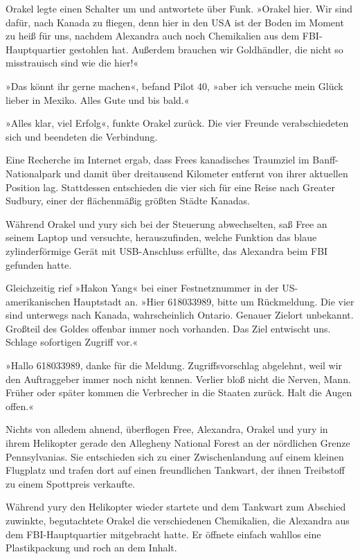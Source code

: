 Orakel legte einen Schalter um und antwortete über Funk. »Orakel hier. Wir sind dafür, nach Kanada zu fliegen, denn hier in den USA ist der Boden im Moment zu heiß für uns, nachdem Alexandra auch noch Chemikalien aus dem FBI-Hauptquartier gestohlen hat. Außerdem brauchen wir Goldhändler, die nicht so misstrauisch sind wie die hier!«

»Das könnt ihr gerne machen«, befand Pilot 40, »aber ich versuche mein Glück lieber in Mexiko. Alles Gute und bis bald.«

»Alles klar, viel Erfolg«, funkte Orakel zurück. Die vier Freunde verabschiedeten sich und beendeten die Verbindung.

Eine Recherche im Internet ergab, dass Frees kanadisches Traumziel im Banff-Nationalpark und damit über dreitausend Kilometer entfernt von ihrer aktuellen Position lag. Stattdessen entschieden die vier sich für eine Reise nach Greater Sudbury, einer der flächenmäßig größten Städte Kanadas.

Während Orakel und yury sich bei der Steuerung abwechselten, saß Free an seinem Laptop und versuchte, herauszufinden, welche Funktion das blaue zylinderförmige Gerät mit USB-Anschluss erfüllte, das Alexandra beim FBI gefunden hatte.

Gleichzeitig rief »Hakon Yang« bei einer Festnetznummer in der US-amerikanischen Hauptstadt an. »Hier 618033989, bitte um Rückmeldung. Die vier sind unterwegs nach Kanada, wahrscheinlich Ontario. Genauer Zielort unbekannt. Großteil des Goldes offenbar immer noch vorhanden. Das Ziel entwischt uns. Schlage sofortigen Zugriff vor.«

»Hallo 618033989, danke für die Meldung. Zugriffsvorschlag abgelehnt, weil wir den Auftraggeber immer noch nicht kennen. Verlier bloß nicht die Nerven, Mann. Früher oder später kommen die Verbrecher in die Staaten zurück. Halt die Augen offen.«

Nichts von alledem ahnend, überflogen Free, Alexandra, Orakel und yury in ihrem Helikopter gerade den Allegheny National Forest an der nördlichen Grenze Pennsylvanias. Sie entschieden sich zu einer Zwischenlandung auf einem kleinen Flugplatz und trafen dort auf einen freundlichen Tankwart, der ihnen Treibstoff zu einem Spottpreis verkaufte.

Während yury den Helikopter wieder startete und dem Tankwart zum Abschied zuwinkte, begutachtete Orakel die verschiedenen Chemikalien, die Alexandra aus dem FBI-Hauptquartier mitgebracht hatte. Er öffnete einfach wahllos eine Plastikpackung und roch an dem Inhalt.

